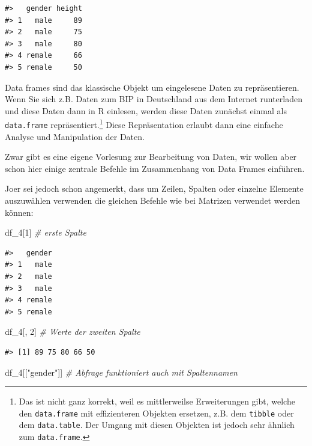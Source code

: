 \documentclass[]{tufte-book}
\newenvironment{Shaded}{}{}
\newcommand{\DecValTok}[1]{\textcolor[rgb]{0.25,0.63,0.44}{#1}}
\newcommand{\StringTok}[1]{\textcolor[rgb]{0.25,0.44,0.63}{#1}}
\newcommand{\CommentTok}[1]{\textcolor[rgb]{0.38,0.63,0.69}{\textit{#1}}}
\newcommand{\NormalTok}[1]{#1}
\begin{document}
\begin{verbatim}
#>   gender height
#> 1   male     89
#> 2   male     75
#> 3   male     80
#> 4 remale     66
#> 5 remale     50
\end{verbatim}

Data frames sind das klassische Objekt um eingelesene Daten zu
repräsentieren. Wenn Sie sich z.B. Daten zum BIP in Deutschland aus dem
Internet runterladen und diese Daten dann in R einlesen, werden diese
Daten zunächst einmal als \texttt{data.frame} repräsentiert.\footnote{Das
  ist nicht ganz korrekt, weil es mittlerweilse Erweiterungen gibt,
  welche den \texttt{data.frame} mit effizienteren Objekten ersetzen,
  z.B. dem \texttt{tibble} oder dem \texttt{data.table}. Der Umgang mit
  diesen Objekten ist jedoch sehr ähnlich zum \texttt{data.frame}.}
Diese Repräsentation erlaubt dann eine einfache Analyse und Manipulation
der Daten.

Zwar gibt es eine eigene Vorlesung zur Bearbeitung von Daten, wir wollen
aber schon hier einige zentrale Befehle im Zusammenhang von Data Frames
einführen.

Joer sei jedoch schon angemerkt, dass um Zeilen, Spalten oder einzelne
Elemente auszuwählen verwenden die gleichen Befehle wie bei Matrizen
verwendet werden können:

\begin{Shaded}
\begin{Highlighting}[]
\NormalTok{df_}\DecValTok{4}\NormalTok{[}\DecValTok{1}\NormalTok{]  }\CommentTok{# erste Spalte}
\end{Highlighting}
\end{Shaded}

\begin{verbatim}
#>   gender
#> 1   male
#> 2   male
#> 3   male
#> 4 remale
#> 5 remale
\end{verbatim}

\begin{Shaded}
\begin{Highlighting}[]
\NormalTok{df_}\DecValTok{4}\NormalTok{[, }\DecValTok{2}\NormalTok{]  }\CommentTok{# Werte der zweiten Spalte}
\end{Highlighting}
\end{Shaded}

\begin{verbatim}
#> [1] 89 75 80 66 50
\end{verbatim}

\begin{Shaded}
\begin{Highlighting}[]
\NormalTok{df_}\DecValTok{4}\NormalTok{[[}\StringTok{"gender"}\NormalTok{]]  }\CommentTok{# Abfrage funktioniert auch mit Spaltennamen}
\end{Highlighting}
\end{Shaded}
\end{document}
